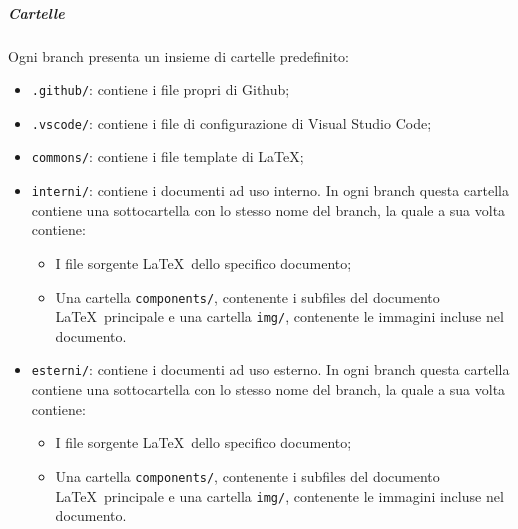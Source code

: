 \documentclass[../norme-di-progetto.tex]{subfiles}
\begin{document}
\subparagraph*{Cartelle}
Ogni branch presenta un insieme di cartelle predefinito:
\begin{itemize}
\item \texttt{.github/}: contiene i file propri di Github;
  \item \texttt{.vscode/}: contiene i file di configurazione di Visual Studio Code;
  \item \texttt{commons/}: contiene i file template di \LaTeX;
  \item \texttt{interni/}: contiene i documenti ad uso interno. In ogni branch questa cartella contiene una sottocartella con lo stesso nome del branch, la quale a sua volta contiene:
  \begin{itemize}
  \item I file sorgente \LaTeX\ dello specifico documento;
  \item Una cartella \texttt{components/}, contenente i subfiles del documento \LaTeX\ principale e una cartella \texttt{img/}, contenente le immagini incluse nel documento.
  \end{itemize}
  \item \texttt{esterni/}: contiene i documenti ad uso esterno. In ogni branch questa cartella contiene una sottocartella con lo stesso nome del branch, la quale a sua volta contiene:
  \begin{itemize}
  \item I file sorgente \LaTeX\ dello specifico documento;
  \item Una cartella \texttt{components/}, contenente i subfiles del documento \LaTeX\ principale e una cartella \texttt{img/}, contenente le immagini incluse nel documento.
  \end{itemize}
\end{itemize}
\end{document}
